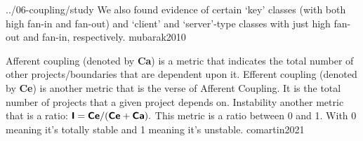\documentclass{article}
\begin{document}
\lnQuote
  {../06-coupling/study}
  {We also found evidence of certain `key' classes (with both high fan-in and fan-out) and `client' and `server'-type classes with just high fan-out and fan-in, respectively.}
  {mubarak2010}


  {Afferent coupling (denoted by \textbf{\textsf{Ca}}) is a metric that indicates the total number of other projects/boundaries that are dependent upon it. Efferent coupling (denoted by \textbf{\textsf{Ce}}) is another metric that is the verse of Afferent Coupling. It is the total number of projects that a given project depends on. Instability another metric that is a ratio: $\textbf{\textsf{I}} = \textbf{\textsf{Ce}} / (\textbf{\textsf{Ce}} + \textbf{\textsf{Ca}}).$ This metric is a ratio between 0 and 1. With 0 meaning it's totally stable and 1 meaning it's unstable.}
  {comartin2021}
\end{document}
